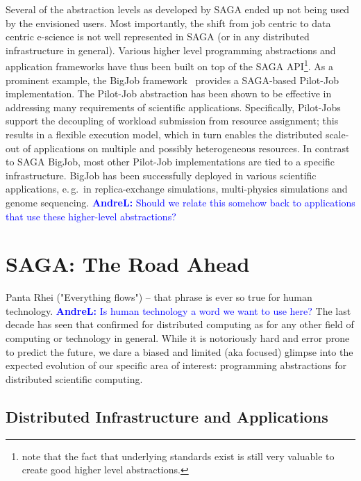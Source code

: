 \documentclass[]{article}
\newcommand{\B}[1]{\textbf{#1}}
\newcommand{\alnote}[1]{{\textcolor{blue}{    \B{AndreL:  } #1 }}}
\newcommand{\alnote}[1]{}
\begin{document}
  Several of the abstraction levels as developed by SAGA ended up not
  being used by the envisioned users.  Most importantly, the shift
  from job centric to data centric e-science is not well represented
  in SAGA (or in any distributed infrastructure in general).  Various
  higher level programming abstractions and application frameworks
  have thus been built on top of the SAGA API\footnote{note that the
  fact that underlying standards exist is still very valuable to
  create good higher level abstractions.}.  As a prominent example,
  the BigJob framework~\cite{saga_bigjob_condor_cloud}  provides a
  SAGA-based Pilot-Job implementation. The Pilot-Job abstraction has
  been shown to be effective in addressing many requirements of
  scientific applications.  Specifically, Pilot-Jobs support the
  decoupling of workload submission from resource assignment; this
  results in a flexible execution model, which in turn enables the
  distributed scale-out of applications on multiple and possibly
  heterogeneous resources. In contrast to SAGA BigJob, most other
  Pilot-Job implementations are tied to a specific infrastructure.
  BigJob has been successfully deployed in various scientific
  applications, e.\,g.\ in replica-exchange simulations, multi-physics
  simulations and genome sequencing.
\alnote{Should we relate this somehow back to applications that use these
higher-level abstractions?	}

\section{SAGA: The Road Ahead}
\label{sec:road}

 Panta Rhei ("Everything flows") -- that phrase is ever so true for
 human technology.\alnote{Is human technology a word we want to use here?}  
 The last decade has seen that confirmed for
 distributed computing as for any other field of computing or
 technology in general.  While it is notoriously hard and error prone
 to predict the future, we dare a biased and limited (aka focused)
 glimpse into the expected evolution of our specific area of interest:
 programming abstractions for distributed scientific computing. 


\subsection{Distributed Infrastructure and Applications}
\end{document}
